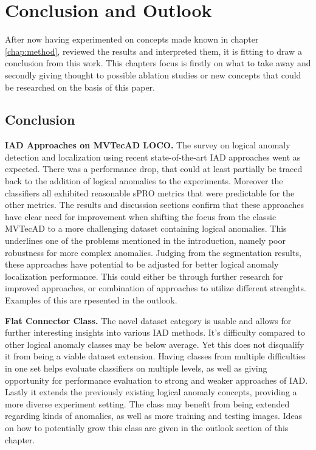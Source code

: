 \chapter{Conclusion and Outlook}
\label{chap:conclusion}


After now having experimented on concepts made known in chapter \ref{chap:method}, reviewed the results and interpreted them, it is 
fitting to draw a conclusion from this work. This chapters focus is firstly on what to take away and secondly giving thought to 
possible ablation studies or new concepts that could be researched on the basis of this paper.


\section{Conclusion}
\label{sec:realconclusion}

\textbf{IAD Approaches on MVTecAD LOCO.}\newline
The survey on logical anomaly detection and localization using recent state-of-the-art IAD approaches went as expected. There was a performance drop, that could at least 
partially be traced back to the addition of logical anomalies to the experiments. Moreover the classifiers all exhibited reasonable sPRO metrics that were predictable for the 
other metrics. The results and discussion sections confirm that these approaches have clear need for improvement when shifting the focus from the classic MVTecAD \cite{MVTEC_Bergmann_2021} 
to a more challenging dataset containing logical anomalies. This underlines one of the problems mentioned in the introduction, namely poor robustness for more complex anomalies. \newline
Judging from the segmentation results, these approaches have potential to be adjusted for better logical anomaly localization performance. This could either be through 
further research for improved approaches, or combination of approaches to utilize different strenghts. Examples of this are rpesented in the outlook.

\textbf{Flat Connector Class.}\newline
The novel dataset category is usable and allows for further interesting insights into various IAD methods. It's difficulty compared to other logical anomaly classes may be 
below average. Yet this does not disqualify it from being a viable dataset extension. Having classes from multiple difficulties in one set helps evaluate classifiers on 
multiple levels, as well as giving opportunity for performance evaluation to strong and weaker approaches of IAD. Lastly it extends the previously existing logical anomaly 
concepts, providing a more diverse experiment setting. \newline
The class may benefit from being extended regarding kinds of anomalies, as well as more training and testing images. Ideas on how to potentially grow this class are given 
in the outlook section of this chapter.

